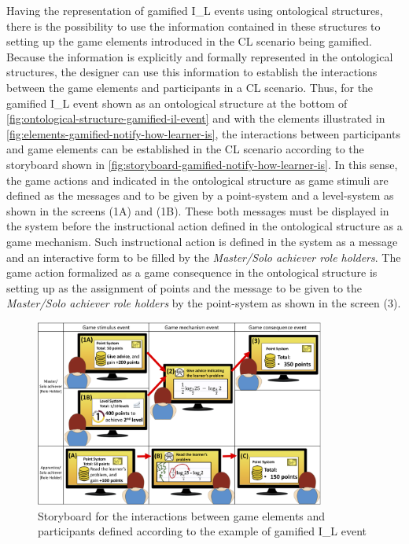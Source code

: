 Having the representation of gamified I\_L events using ontological structures, there is the possibility to use the information contained in these structures to setting up the game elements introduced in the CL scenario being gamified.
Because the information is explicitly and formally represented in the ontological structures, the designer can use this information to establish the interactions between the game elements and participants in a CL scenario.
Thus, for the gamified I\_L event  shown as an ontological structure at the bottom of \autoref{fig:ontological-structure-gamified-il-event} and with the elements illustrated in \autoref{fig:elements-gamified-notify-how-learner-is}, the interactions between participants and game elements can be established in the CL scenario according to the storyboard shown in \autoref{fig:storyboard-gamified-notify-how-learner-is}.
In this sense, the game actions  and  indicated in the ontological structure as game stimuli are defined as the messages  and  to be given by a point-system and a level-system as shown in the screens (1A) and (1B).
These both messages must be displayed in the system before the instructional action  defined in the ontological structure as a game mechanism. Such instructional action is defined in the system as a message  and an interactive form to be filled by the \emph{Master/Solo achiever role holders}.
The game action  formalized as a game consequence in the ontological structure is setting up as the assignment of points and the message to be given to the \emph{Master/Solo achiever role holders} by the point-system as shown in the screen (3).

\begin{figure}[!htbp]
 \caption{Storyboard for the interactions between game elements and participants defined according to the example of gamified I\_L event }
 \label{fig:storyboard-gamified-notify-how-learner-is}
 \centering
 \includegraphics[width=0.85\textwidth]{images/chap-ontogacles2/storyboard-gamified-notify-how-learner-is.png}
 \fautor
\end{figure}

